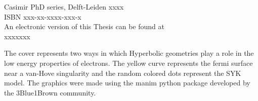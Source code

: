 \begin{titlepage}
\vspace{2\bigskipamount}

\vspace*{\fill}
\noindent
Casimir PhD series, Delft-Leiden xxxx\\
ISBN xxx-xx-xxxx-xxx-x\\

\vspace{5pt}
\noindent
An electronic version of this Thesis can be found at \\ 
xxxxxxx


\vspace*{\fill}
\noindent
The cover represents two ways in which Hyperbolic geometries play a role in the low energy properties of electrons. The yellow curve represents the fermi surface near a van-Hove singularity and the random colored dots represent the SYK model. The graphics were made using the manim python package developed by the 3Blue1Brown community. 

\clearpage
\thispagestyle{empty}


\end{titlepage}

